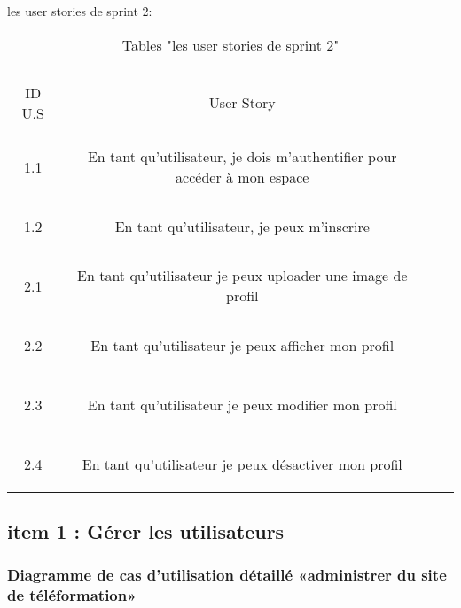 
\begin{table}[h]
{\Large \color{cyan} les user stories de sprint 2:}\\
	
	\begin{center}
		\begin{tabular}{>{\begin{bf} } c <{\end{bf}}ccc}
			
			\rowcolor{-blue!20!red}ID U.S & \begin{bf}User Story \end{bf}  & \\
			
			
			1.1  & En tant qu’utilisateur, je dois m’authentifier pour accéder à mon espace \\& \\
		1.2  & En tant qu’utilisateur, je peux m’inscrire \\& \\
			2.1 & En tant qu’utilisateur je peux uploader une image de profil \\& \\
			2.2  & En tant qu’utilisateur je peux afficher mon profil \\& \\
			2.3  & En tant qu’utilisateur je peux modifier mon profil \\& \\
			2.4 & En tant qu’utilisateur je peux désactiver mon profil \\
			
			
		\end{tabular}
	\end{center}
	\caption{Tables  "les user stories de sprint 2"}
	\label{les user stories de sprint 2}
\end{table}


\clearpage

\clearpage
 
\subsection{item 1 : Gérer les utilisateurs}
\subsubsection{Diagramme de cas d’utilisation  détaillé «administrer du site de téléformation» }

